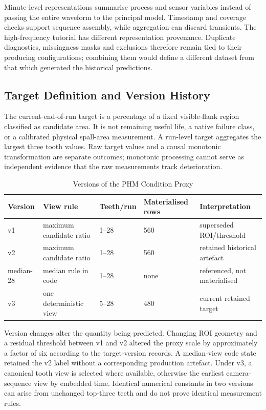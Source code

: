 Minute-level representations summarise process and sensor variables instead of passing
the entire waveform to the principal model. Timestamp and coverage checks support
sequence assembly, while aggregation can discard transients. The high-frequency tutorial
has different representation provenance. Duplicate diagnostics, missingness masks and
exclusions therefore remain tied to their producing configurations; combining them would
define a different dataset from that which generated the historical predictions.

\subsection{Target Definition and Version History}
The current-end-of-run target is a percentage of a fixed visible-flank region classified
as candidate area. It is not remaining useful life, a native failure class, or a
calibrated physical spall-area measurement. A run-level target aggregates the largest
three tooth values. Raw target values and a causal monotonic transformation are separate
outcomes; monotonic processing cannot serve as independent evidence that the raw
measurements track deterioration.

\begin{table}[htbp]
\caption{Versions of the PHM Condition Proxy}\label{tab:phm-target-lineage}
\centering\small
\begin{tabularx}{\textwidth}{@{}P{18mm}YP{18mm}P{23mm}Y@{}}\toprule
Version & View rule & Teeth/run & Materialised rows & Interpretation\\\midrule
v1 & maximum candidate ratio & 1--28 & 560 & superseded ROI/threshold\\
v2 & maximum candidate ratio & 1--28 & 560 & retained historical artefact\\
median-28 & median rule in code & 1--28 & none & referenced, not materialised\\
v3 & one deterministic view & 5--28 & 480 & current retained target\\\bottomrule
\end{tabularx}
\end{table}

Version changes alter the quantity being predicted. Changing ROI geometry and a residual
threshold between v1 and v2 altered the proxy scale by approximately a factor of six
according to the target-version records. A median-view code state retained the v2 label
without a corresponding production artefact. Under v3, a canonical tooth view is
selected where available, otherwise the earliest camera-sequence view by embedded time.
Identical numerical constants in two versions can arise from unchanged top-three teeth
and do not prove identical measurement rules.

